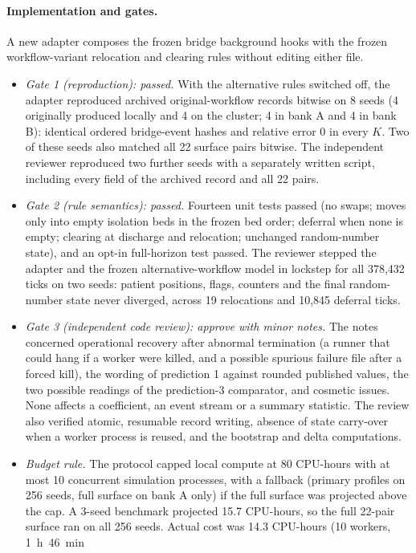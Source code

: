 \paragraph{Implementation and gates.} A new adapter composes the frozen bridge
background hooks with the frozen workflow-variant relocation and clearing rules
without editing either file.
\begin{itemize}
\item \emph{Gate 1 (reproduction): passed.} With the alternative rules switched
off, the adapter reproduced archived original-workflow records bitwise on 8
seeds (4 originally produced locally and 4 on the cluster; 4 in bank A and 4 in
bank B): identical ordered bridge-event hashes and relative error 0 in every
$K$. Two of these seeds also matched all 22 surface pairs bitwise. The
independent reviewer reproduced two further seeds with a separately written
script, including every field of the archived record and all 22 pairs.
\item \emph{Gate 2 (rule semantics): passed.} Fourteen unit tests passed (no
swaps; moves only into empty isolation beds in the frozen bed order; deferral
when none is empty; clearing at discharge and relocation; unchanged random-number
state), and an opt-in full-horizon test passed. The reviewer stepped the adapter
and the frozen alternative-workflow model in lockstep for all 378,432 ticks on two seeds:
patient positions, flags, counters and the final random-number state never
diverged, across 19 relocations and 10,845 deferral ticks.
\item \emph{Gate 3 (independent code review): approve with minor notes.} The
notes concerned operational recovery after abnormal termination (a runner that
could hang if a worker were killed, and a possible spurious failure file after a
forced kill), the wording of prediction 1 against rounded published values, the
two possible readings of the prediction-3 comparator, and cosmetic issues. None
affects a coefficient, an event stream or a summary statistic. The review also
verified atomic, resumable record writing, absence of state carry-over when a
worker process is reused, and the bootstrap and delta computations.
\item \emph{Budget rule.} The protocol capped local compute at 80 CPU-hours with
at most 10 concurrent simulation processes, with a fallback (primary profiles on
256 seeds, full surface on bank A only) if the full surface was projected above
the cap. A 3-seed benchmark projected 15.7 CPU-hours, so the full 22-pair surface
ran on all 256 seeds. Actual cost was 14.3 CPU-hours (10 workers, 1~h~46~min

\end{itemize}
